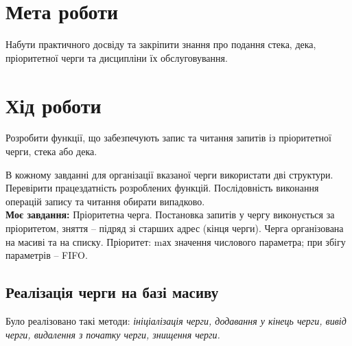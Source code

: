 \section{Мета роботи}
Набути практичного досвіду та закріпити знання про подання
стека, дека, пріоритетної черги та дисципліни їх обслуговування.

\section{Хід роботи}
  Розробити функції, що забезпечують запис та читання запитів із
пріоритетної черги, стека або дека.

  В кожному завданні для організації вказаної черги використати дві
структури. Перевірити працездатність розроблених функцій. Послідовність
виконання операцій запису та читання обирати випадково.\\

\textbf{Моє завдання:}
  Пріоритетна черга. Постановка запитів у чергу виконується за
пріоритетом, зняття – підряд зі старших адрес (кінця черги). Черга
організована на масиві та на списку. Пріоритет: mах значення числового
параметра; при збігу параметрів – FIFO.

\clearpage
\subsection{Реалізація черги на базі масиву}
	Було реалізовано такі методи: \textit{ініціалізація черги, додавання у кінець черги, 
вивід черги, видалення з початку черги, знищення черги.}

